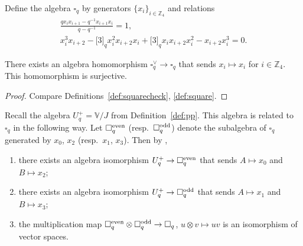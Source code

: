 \begin{Definition}\label{def:square} Define the algebra $\square_q$ by generators $\lbrace x_i \rbrace_{i \in \mathbb Z_4}$ and relations
\begin{gather*}
\frac{q x_i x_{i+1}-q^{-1}x_{i+1}x_i}{q-q^{-1}} = 1,\\ %
x^3_i x_{i+2} - \lbrack 3 \rbrack_q x^2_i x_{i+2} x_i +\lbrack 3 \rbrack_q x_i x_{i+2} x^2_i -x_{i+2} x^3_i = 0.%
\end{gather*}
\end{Definition}

\begin{Lemma}\label{lem:add}There exists an algebra homomorphism $\square^\vee_q \to \square_q$ that sends
$x_i \mapsto x_i$ for $i \in {\mathbb Z}_4$. This homomorphism is surjective.
\end{Lemma}
\begin{proof} Compare Definitions~\ref{def:squarecheck}, \ref{def:square}.
\end{proof}

Recall the algebra $U^+_q=\mathbb V/J$ from Definition~\ref{def:pp}. This algebra is related to~$\square_q$ in the following way. Let $ \square^{\rm even}_q$ (resp.\ $ \square^{\rm odd}_q$) denote the subalgebra
of $ \square_q$ generated by $x_0$, $x_2$ (resp.\ $x_1$, $x_3$). Then by \cite[Proposition~5.5]{pospart},
 \begin{enumerate}\itemsep=0pt
\item[\rm (i)] there exists an algebra isomorphism $U^+_q \to \square^{\rm even}_q$ that sends
 $A\mapsto x_0$ and $B\mapsto x_2$;
\item[\rm (ii)] there exists an algebra isomorphism $U^+_q \to \square^{\rm odd}_q$ that sends $A\mapsto x_1$ and $B\mapsto x_3$;
\item[\rm (iii)] the multiplication map $\square^{\rm even}_q \otimes \square^{\rm odd}_q \to \square_q$,
 $u \otimes v \mapsto uv$ is an isomorphism of vector spaces.
\end{enumerate}

